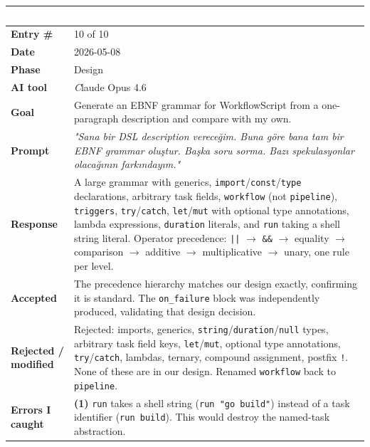 \documentclass[a4paper,10pt]{article}
\begin{document}
\begin{tabular}{|
    >{\bfseries}m{3.5cm}|
    m{10cm}|
}
\hline
\rowcolor{headerblue}
\textcolor{white}{Field} & \textcolor{white}{\textbf{Content}} \\
\hline
\rowcolor{white}
Entry \#        & 10 of 10 \\
\hline
\rowcolor{altrow}
Date            & 2026-05-08 \\
\hline
\rowcolor{white}
Phase           & Design \\
\hline
\rowcolor{altrow}
AI tool         & \textit Claude Opus 4.6 \\
\hline
\rowcolor{white}
Goal            & Generate an EBNF grammar for WorkflowScript from a
                  one-paragraph description and compare with my own. \\
\hline
\rowcolor{altrow}
Prompt          & \textit{"Sana bir DSL description vereceğim. Buna göre bana tam bir EBNF grammar oluştur. Başka soru sorma. Bazı spekulasyonlar olacağının farkındayım."} \\
\hline
\rowcolor{white}
Response &
    A large grammar with generics, \texttt{import}/\texttt{const}/\texttt{type}
    declarations, arbitrary task fields, \texttt{workflow} (not \texttt{pipeline}),
    \texttt{triggers}, \texttt{try}/\texttt{catch}, \texttt{let}/\texttt{mut}
    with optional type annotations, lambda expressions, \texttt{duration}
    literals, and \texttt{run} taking a shell string literal.
    Operator precedence: \texttt{||} $\to$ \texttt{\&\&} $\to$
    equality $\to$ comparison $\to$ additive $\to$ multiplicative $\to$
    unary, one rule per level. \\
\hline
\rowcolor{altrow}
Accepted        &
    The precedence hierarchy matches our design exactly, confirming it is
    standard. The \texttt{on\_failure} block was independently produced,
    validating that design decision. \\
\hline
\rowcolor{white}
Rejected / modified &
    Rejected: imports, generics, \texttt{string}/\texttt{duration}/\texttt{null}
    types, arbitrary task field keys, \texttt{let}/\texttt{mut}, optional
    type annotations, \texttt{try}/\texttt{catch}, lambdas, ternary,
    compound assignment, postfix \texttt{!}.
    None of these are in our design.
    Renamed \texttt{workflow} back to \texttt{pipeline}. \\
\hline
\rowcolor{altrow}
Errors I caught &
    \textbf{(1)} \texttt{run} takes a shell string (\texttt{run "go build"})
    instead of a task identifier (\texttt{run build}).
    This would destroy the named-task abstraction.

\end{tabular}
\end{document}
